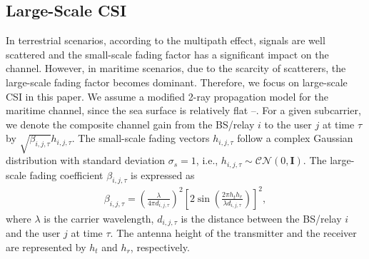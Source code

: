 \documentclass[conference]{IEEEtran}
\begin{document}
 \subsection{Large-Scale CSI}
 
 In terrestrial scenarios, according to the multipath effect, signals are well scattered and the small-scale fading factor has a significant impact on the channel. However, in maritime scenarios, due to the scarcity of scatterers, the large-scale fading factor becomes dominant. Therefore, we focus on large-scale CSI in this paper.
 We assume a modified 2-ray propagation model for the maritime channel, since the sea surface is relatively flat \cite{p0}--\cite{p2}. For a given subcarrier, we denote the composite channel gain from the BS/relay $i$ to the user $j$ at time $\tau $ by $\sqrt {{\beta _{i,j,\tau }}} {h_{i,j,\tau }}$. The small-scale fading vectors ${h_{i,j,\tau }}$ follow a complex Gaussian distribution with standard deviation ${\sigma _s} = 1$, i.e., ${h_{i,j,\tau }} \sim \mathcal{CN}(0, \mathbf{I})$. The large-scale fading coefficient ${\beta _{i,j,\tau }}$ is expressed as
 \begin{align}
 {\beta _{i,j,\tau }} = {\left( {\frac{\lambda }{{4\pi {d_{i,j,\tau }}}}} \right)^2}{\left[ {2\sin \left( {\frac{{2\pi {h_t}{h_r}}}{{\lambda {d_{i,j,\tau }}}}} \right)} \right]^2} ,
 \end{align}
 where $\lambda $ is the carrier wavelength, ${d_{i,j,\tau }}$ is the distance between the BS/relay $i$ and the user $j$ at time $\tau $. The antenna height of the transmitter and the receiver are represented by $h_t$ and $h_r$, respectively. 
 
\end{document}
